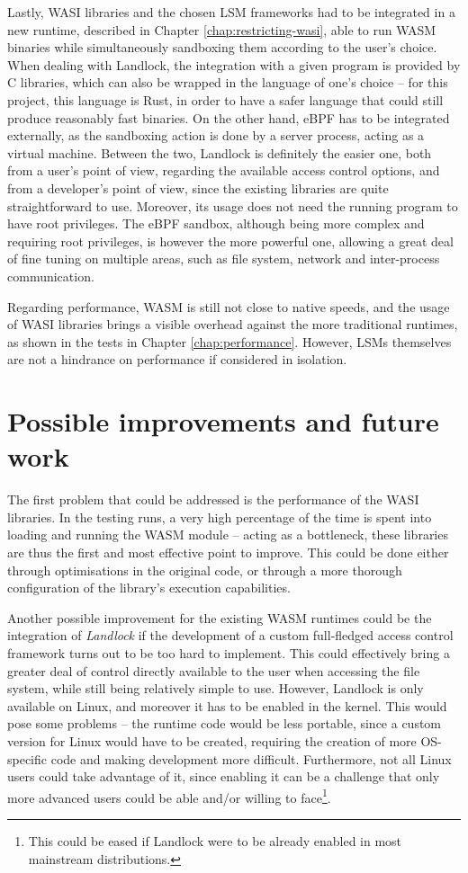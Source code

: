 Lastly, WASI libraries and the chosen LSM frameworks had to be integrated in a new runtime, described in
Chapter \ref{chap:restricting-wasi}, able to run WASM binaries while simultaneously sandboxing them according to the user's choice.
When dealing with Landlock, the integration with a given program is provided by C libraries,
which can also be wrapped in the language of one's choice -- for this project, this language is Rust,
in order to have a safer language that could still produce reasonably fast binaries.
On the other hand, eBPF has to be integrated externally, as the sandboxing action is done by
a server process, acting as a virtual machine.
Between the two, Landlock is definitely the easier one, both from a user's point of view,
regarding the available access control options, and from a developer's point of view, since
the existing libraries are quite straightforward to use. Moreover, its usage does not need the running program
to have root privileges.
The eBPF sandbox, although being more complex and requiring root privileges, is however
the more powerful one, allowing a great deal of fine tuning on multiple areas,
such as file system, network and inter-process communication.

Regarding performance, WASM is still not close to native speeds, and the usage of WASI libraries
brings a visible overhead against the more traditional runtimes, as shown in the tests in Chapter \ref{chap:performance}.
However, LSMs themselves are not a hindrance on performance if considered in isolation.

\section{Possible improvements and future work}

The first problem that could be addressed is the performance of the WASI libraries.
In the testing runs, a very high percentage of the time is spent into loading and running the WASM module --
acting as a bottleneck, these libraries are thus the first and most effective point to improve.
This could be done either through optimisations in the original code, or through a more thorough
configuration of the library's execution capabilities.

Another possible improvement for the existing WASM runtimes could be the integration of \textit{Landlock}
if the development of a custom full-fledged access control framework turns out to be too hard to implement.
This could effectively bring a greater deal of control directly available to the user when
accessing the file system, while still being relatively simple to use.
However, Landlock is only available on Linux, and moreover it has to be enabled in the kernel.
This would pose some problems -- the runtime code would be less portable,
since a custom version for Linux would have to be created, requiring
the creation of more OS-specific code and making development more difficult.
Furthermore, not all Linux users could take advantage of it, since enabling it can be a challenge that only more advanced users
could be able and/or willing to face\footnote{This could be eased if Landlock were to be already enabled in most mainstream distributions.}.
